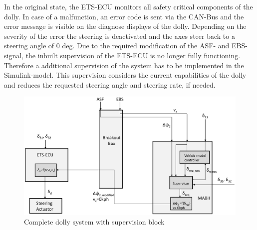 \documentclass[ExampleMasters.tex]{subfiles}
\begin{document}
In the original state, the \gls{ETS}-\gls{ECU} monitors all safety critical components of the dolly. In case of a malfunction, an error code is sent via the \gls{CAN}-Bus and the error message is visible on the diagnose displays of the dolly. Depending on the severity of the error the steering is deactivated and the axes steer back to a steering angle of 0 deg.
Due to the required modification of the \gls{ASF}- and \gls{EBS}-signal, the inbuilt supervision of the \gls{ETS}-\gls{ECU} is no longer fully functioning. Therefore a additional supervision of the system has to be implemented in the Simulink-model. This supervision considers the current capabilities of the dolly and reduces the requested steering angle and steering rate, if needed. 

\begin{figure}[!htb]
	\centering
	\includegraphics[width=1\linewidth]{figures/system_mod}
	\caption{Complete dolly system with supervision block}
	\label{fig:system_modification}
\end{figure}
\end{document}
